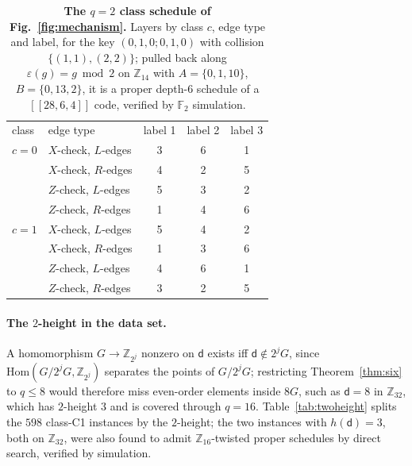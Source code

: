 \documentclass[reprint,twocolumn,superscriptaddress,nofootinbib]{revtex4-2}
\theoremstyle{plain}
\newcommand{\F}{\mathbb{F}_2}
\newcommand{\col}{\mathsf{d}}          %
\begin{document}
\begin{table}[!htbp]
\caption{\textbf{The $q=2$ class schedule of Fig.~\ref{fig:mechanism}.}
Layers by class $c$, edge type and label, for the key $(0,1,0;0,1,0)$ with
collision $\{(1,1),(2,2)\}$; pulled back along $\varepsilon(g)=g\bmod2$ on
$\mathbb{Z}_{14}$ with $A=\{0,1,10\}$, $B=\{0,13,2\}$, it is a proper
depth-$6$ schedule of a $[[28,6,4]]$ code, verified by $\F$
simulation.}
\label{tab:template-m2}
\begin{ruledtabular}
\begin{tabular}{llccc}
class & edge type & label 1 & label 2 & label 3 \\
\colrule
$c=0$ & $X$-check, $L$-edges & 3 & 6 & 1 \\
      & $X$-check, $R$-edges & 4 & 2 & 5 \\
      & $Z$-check, $L$-edges & 5 & 3 & 2 \\
      & $Z$-check, $R$-edges & 1 & 4 & 6 \\
\colrule
$c=1$ & $X$-check, $L$-edges & 5 & 4 & 2 \\
      & $X$-check, $R$-edges & 1 & 3 & 6 \\
      & $Z$-check, $L$-edges & 4 & 6 & 1 \\
      & $Z$-check, $R$-edges & 3 & 2 & 5 \\
\end{tabular}
\end{ruledtabular}
\end{table}

\paragraph*{The $2$-height in the data set.}
A homomorphism $G\to\mathbb{Z}_{2^j}$ nonzero on $\col$ exists iff
$\col\notin2^jG$, since $\mathrm{Hom}(G/2^jG,\mathbb{Z}_{2^j})$ separates
the points of $G/2^jG$; restricting Theorem~\ref{thm:six} to $q\le8$ would
therefore miss even-order elements inside $8G$, such as $\col=8$ in
$\mathbb{Z}_{32}$, which has $2$-height $3$ and is covered through $q=16$.
Table~\ref{tab:twoheight} splits the $598$ class-C1 instances by the
$2$-height; the two instances with $h(\col)=3$, both on $\mathbb{Z}_{32}$,
were also found to admit $\mathbb{Z}_{16}$-twisted proper schedules by
direct search, verified by simulation.
\end{document}
